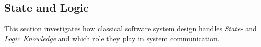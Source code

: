 %
%
%
%
%
%
%

\subsection{State and Logic}
\label{state_and_logic_heading}

This section investigates how classical software system design handles
\emph{State-} and \emph{Logic Knowledge} and which role they play in system
communication.





